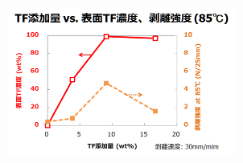 \documentclass[unicode,12pt]{beamer}%
\begin{document}
\begin{frame}
\begin{columns}
\begin{column}{6.0cm}
\begin{figure}[htbp]
			\begin{center}
				\includegraphics[width=60mm]{nakamura-1.png}
			\end{center}
		\end{figure}
	\end{column}
\end{columns}

\end{frame}
\end{document}
